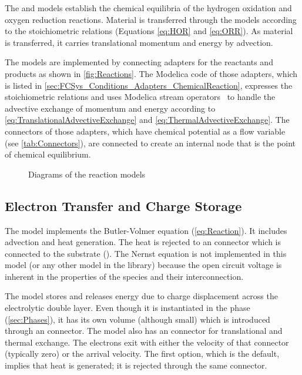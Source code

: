 The  and  models establish the chemical equilibria of the hydrogen oxidation and oxygen reduction reactions.  Material is transferred through the models according to the stoichiometric relations (Equations \ref{eq:HOR} and \ref{eq:ORR}).  As material is transferred, it carries translational momentum and energy by advection.

The models are implemented by connecting  adapters for the reactants and products as shown in \autoref{fig:Reactions}.  The Modelica code of those adapters, which is listed in \autoref{sec:FCSys_Conditions_Adapters_ChemicalReaction}, expresses the stoichiometric relations and uses Modelica stream operators~\cite{Modelica3.2} to handle the advective exchange of momentum and energy according to \autoref{eq:TranslationalAdvectiveExchange} and \autoref{eq:ThermalAdvectiveExchange}.  The  connectors of those adapters, which have chemical potential as a flow variable (see \autoref{tab:Connectors}), are connected to create an internal node that is the point of chemical equilibrium.  

\begin{figure}[htbp]
  \quad
  \caption{Diagrams of the reaction models}
  \label{fig:Reactions}
\end{figure}
 

\subsection{Electron Transfer and Charge Storage}

The  model implements the Butler-Volmer equation (\ref{eq:Reaction}).  It includes advection and heat generation.  The heat is rejected to an  connector which is connected to the substrate ().  The Nernst equation is not implemented in this model (or any other model in the library) because the open circuit voltage is inherent in the properties of the species and their interconnection.

The  model stores and releases energy due to charge displacement across the electrolytic double layer.  Even though it is instantiated in the  phase (\autoref{sec:Phases}), it has its own volume (although small) which is introduced through an  connector.  The   model also has an  connector for translational and thermal exchange.  The electrons exit with either the velocity of that connector (typically zero) or the arrival velocity.  The first option, which is the default, implies that heat is generated; it is rejected through the same connector.  

